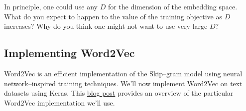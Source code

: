 \begin{solution}
\end{solution}


\problem[3]
In principle, one could use any $D$ for the dimension of the embedding space.  What do you expect to happen to the value of the training objective as $D$ increases?  Why do you think one might not want to use very large $D$?

\begin{solution}
\end{solution}

\subsection{Implementing Word2Vec}
Word2Vec is an efficient implementation of the Skip--gram model using neural network--inspired training techniques. We'll now implement Word2Vec on text datasets using Keras.  This 
\href{http://mccormickml.com/2016/04/19/word2vec-tutorial-the-skip-gram-model/}{blog post} provides an overview of the particular Word2Vec implementation we'll use.


